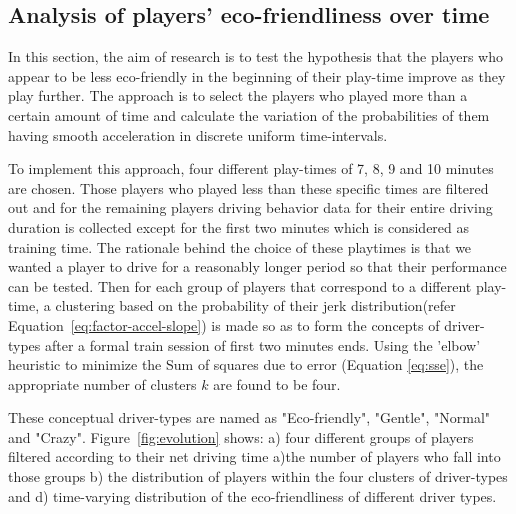 \documentclass[preprint,authoryear,12pt]{elsarticle}
\begin{document}
\subsection{Analysis of players' eco-friendliness over time }
\label{subsec:eco-friendliness_over_time}

In this section, the aim of research is to test the hypothesis that the players who appear to be less eco-friendly in the beginning of their play-time improve as they play further. The approach is to select the players who played more than a certain amount of time and calculate the variation of the probabilities of them having smooth acceleration in discrete uniform time-intervals. 

To implement this approach, four different play-times of 7, 8, 9 and 10 minutes are chosen. Those players who played less than these specific times are filtered out and for the remaining players driving behavior data for their entire driving duration is collected except for the first two minutes which is considered as training time.  
The rationale behind the choice of these playtimes is that we wanted a player to drive for a reasonably longer period so that their performance can be tested. Then for each group of players that correspond to a different play-time, a clustering based on the probability of their jerk distribution(refer Equation~\ref{eq:factor-accel-slope}) is made so as to form the concepts of driver-types after a formal train session of first two minutes ends.  Using the 'elbow' heuristic to minimize the Sum of squares due to error (Equation \ref{eq:sse}), the appropriate number of clusters $k$ are found to be four. 


These conceptual driver-types are named as "Eco-friendly", "Gentle", "Normal" and "Crazy". Figure~\ref{fig:evolution} shows: a) four different groups of players filtered according to their net driving time  a)the number of players who fall into those groups b) the distribution of players within the four clusters of driver-types and d) time-varying distribution of the eco-friendliness of different driver types. 
\end{document}
